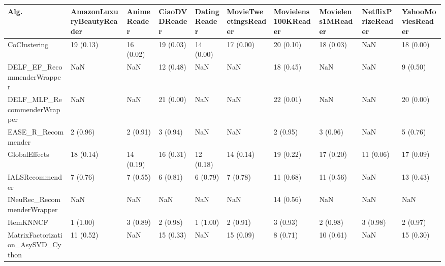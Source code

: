 \begin{tabular}{llllllllll}
\toprule
                               Alg. & AmazonLuxuryBeautyReader & AnimeReader & CiaoDVDReader & DatingReader & MovieTweetingsReader & Movielens100KReader & Movielens1MReader & NetflixPrizeReader & YahooMoviesReader \\
\midrule
                       CoClustering &                19 (0.13) &   16 (0.02) &     19 (0.03) &    14 (0.00) &            17 (0.00) &           20 (0.10) &         18 (0.03) &                NaN &         18 (0.00) \\
         DELF\_EF\_RecommenderWrapper &                      NaN &         NaN &     12 (0.48) &          NaN &                  NaN &           18 (0.45) &               NaN &                NaN &          9 (0.50) \\
        DELF\_MLP\_RecommenderWrapper &                      NaN &         NaN &     21 (0.00) &          NaN &                  NaN &           22 (0.01) &               NaN &                NaN &         20 (0.00) \\
                 EASE\_R\_Recommender &                 2 (0.96) &    2 (0.91) &      3 (0.94) &          NaN &                  NaN &            2 (0.95) &          3 (0.96) &                NaN &          5 (0.76) \\
                      GlobalEffects &                18 (0.14) &   14 (0.19) &     16 (0.31) &    12 (0.18) &            14 (0.14) &           19 (0.22) &         17 (0.20) &          11 (0.06) &         17 (0.09) \\
                    IALSRecommender &                 7 (0.76) &    7 (0.55) &      6 (0.81) &     6 (0.79) &             7 (0.78) &           11 (0.68) &         11 (0.56) &                NaN &         13 (0.43) \\
         INeuRec\_RecommenderWrapper &                      NaN &         NaN &           NaN &          NaN &                  NaN &           14 (0.56) &               NaN &                NaN &               NaN \\
                          ItemKNNCF &                 1 (1.00) &    3 (0.89) &      2 (0.98) &     1 (1.00) &             2 (0.91) &            3 (0.93) &          2 (0.98) &           3 (0.98) &          2 (0.97) \\
  MatrixFactorization\_AsySVD\_Cython &                11 (0.52) &         NaN &     15 (0.33) &          NaN &            15 (0.09) &            8 (0.71) &         10 (0.61) &                NaN &         15 (0.30) \\

\end{tabular}

